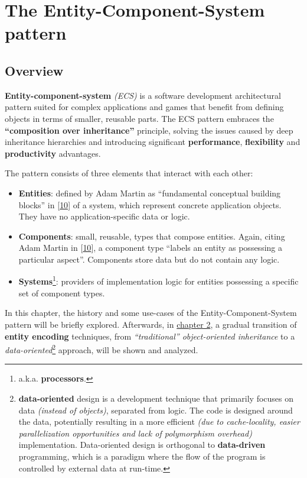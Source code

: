 \documentclass[twoside, 12pt, a4paper, openany]{book}
\begin{document}
\part{The Entity-Component-System pattern}

\hypertarget{ecs_part_overview}{\chapter{Overview}\label{ecs_part_overview}}

\textbf{Entity-component-system} \emph{(ECS)} is a software development
architectural pattern suited for complex applications and games that
benefit from defining objects in terms of smaller, reusable parts. The
ECS pattern embraces the \textbf{``composition over inheritance''}
principle, solving the issues caused by deep inheritance hierarchies and
introducing significant \textbf{performance}, \textbf{flexibility} and
\textbf{productivity} advantages.

The pattern consists of three elements that interact with each other:

\begin{itemize}
\item
  \textbf{Entities}: defined by Adam Martin as ``fundamental conceptual
  building blocks'' in
  {[}\protect\hyperlink{ref-tmachine_esmmogfuturep2_2007}{10}{]} of a
  system, which represent concrete application objects. They have no
  application-specific data or logic.
\item
  \textbf{Components}: small, reusable, types that compose entities.
  Again, citing Adam Martin in
  {[}\protect\hyperlink{ref-tmachine_esmmogfuturep2_2007}{10}{]}, a
  component type ``labels an entity as possessing a particular aspect''.
  Components store data but do not contain any logic.
\item
  \textbf{Systems}\footnote{a.k.a. \textbf{processors}.}: providers of
  implementation logic for entities possessing a specific set of
  component types.
\end{itemize}

In this chapter, the history and some use-cases of the
Entity-Component-System pattern will be briefly explored. Afterwards, in
\protect\hyperlink{chapter_encoding_entities}{chapter 2}, a gradual
transition of \textbf{entity encoding} techniques, from
\emph{``traditional'' object-oriented inheritance} to a
\emph{data-oriented}\footnote{\textbf{data-oriented} design is a
  development technique that primarily focuses on data \emph{(instead of
  objects)}, separated from logic. The code is designed around the data,
  potentially resulting in a more efficient \emph{(due to
  cache-locality, easier parallelization opportunities and lack of
  polymorphism overhead)} implementation. Data-oriented design is
  orthogonal to \textbf{data-driven} programming, which is a paradigm
  where the flow of the program is controlled by external data at
  run-time.} approach, will be shown and analyzed.
\end{document}
